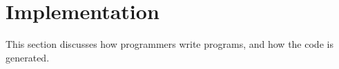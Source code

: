 \section{Implementation}\label{sec:implementation}

This section discusses how programmers write \system programs, and how the code is generated.

  


            
  
    

    
